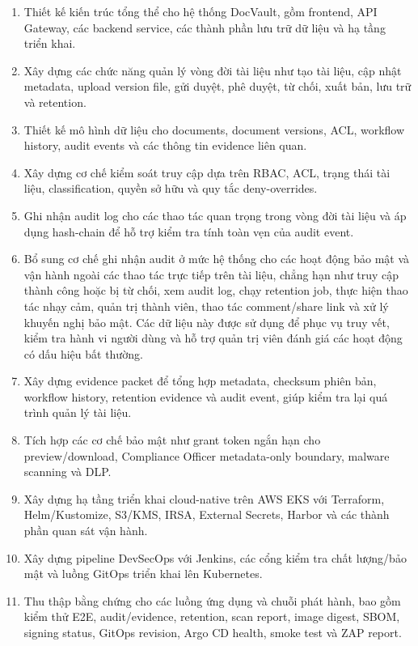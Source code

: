 \begin{enumerate}
  \item Thiết kế kiến trúc tổng thể cho hệ thống DocVault, gồm frontend, API Gateway, các backend service, các thành phần lưu trữ dữ liệu và hạ tầng triển khai.
  \item Xây dựng các chức năng quản lý vòng đời tài liệu như tạo tài liệu, cập nhật metadata, upload version file, gửi duyệt, phê duyệt, từ chối, xuất bản, lưu trữ và retention.
  \item Thiết kế mô hình dữ liệu cho documents, document versions, ACL, workflow history, audit events và các thông tin evidence liên quan.
  \item Xây dựng cơ chế kiểm soát truy cập dựa trên RBAC, ACL, trạng thái tài liệu, classification, quyền sở hữu và quy tắc deny-overrides.
  \item Ghi nhận audit log cho các thao tác quan trọng trong vòng đời tài liệu và áp dụng hash-chain để hỗ trợ kiểm tra tính toàn vẹn của audit event.
  \item Bổ sung cơ chế ghi nhận audit ở mức hệ thống cho các hoạt động bảo mật và vận hành ngoài các thao tác trực tiếp trên tài liệu, chẳng hạn như truy cập thành công hoặc bị từ chối, xem audit log, chạy retention job, thực hiện thao tác nhạy cảm, quản trị thành viên, thao tác comment/share link và xử lý khuyến nghị bảo mật. Các dữ liệu này được sử dụng để phục vụ truy vết, kiểm tra hành vi người dùng và hỗ trợ quản trị viên đánh giá các hoạt động có dấu hiệu bất thường.
  \item Xây dựng evidence packet để tổng hợp metadata, checksum phiên bản, workflow history, retention evidence và audit event, giúp kiểm tra lại quá trình quản lý tài liệu.
  \item Tích hợp các cơ chế bảo mật như grant token ngắn hạn cho preview/download, Compliance Officer metadata-only boundary, malware scanning và DLP.
  \item Xây dựng hạ tầng triển khai cloud-native trên AWS EKS với Terraform, Helm/Kustomize, S3/KMS, IRSA, External Secrets, Harbor và các thành phần quan sát vận hành.
  \item Xây dựng pipeline DevSecOps với Jenkins, các cổng kiểm tra chất lượng/bảo mật và luồng GitOps triển khai lên Kubernetes.
  \item Thu thập bằng chứng cho các luồng ứng dụng và chuỗi phát hành, bao gồm kiểm thử E2E, audit/evidence, retention, scan report, image digest, SBOM, signing status, GitOps revision, Argo CD health, smoke test và ZAP report.
\end{enumerate}

